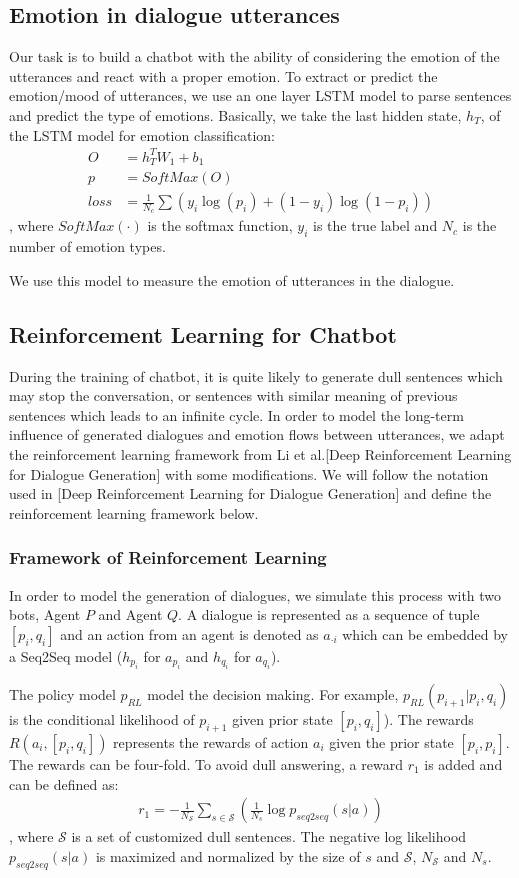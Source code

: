 \documentclass{article}
\begin{document}
\subsection{Emotion in dialogue utterances}
Our task is to build a chatbot with the ability of considering the emotion of the utterances and react with a proper emotion. To extract or predict the emotion/mood of utterances, we use an one layer LSTM model to parse sentences and predict the type of emotions. Basically, we take the last hidden state, $h_T$, of the LSTM model for emotion classification:
\begin{align*}
O &= h_T^TW_1 + b_1\\
p &= SoftMax(O)\\
loss &= \frac{1}{N_{c}}\sum (y_i\log(p_i) + (1-y_i)\log(1 - p_i))
\end{align*}
, where $SoftMax(\cdot)$ is the softmax function, $y_i$ is the true label and $N_c$ is the number of emotion types.

We use this model to measure the emotion of utterances in the dialogue.

\subsection{Reinforcement Learning for Chatbot}
During the training of chatbot, it is quite likely to generate dull sentences which may stop the conversation, or sentences with similar meaning of previous sentences which leads to an infinite cycle. In order to model the long-term influence of generated dialogues and emotion flows between utterances, we adapt the reinforcement learning framework from Li et al.[Deep Reinforcement Learning for Dialogue Generation] with some modifications. We will follow the notation used in [Deep Reinforcement Learning for Dialogue Generation] and define the reinforcement learning framework below.

\subsubsection{Framework of Reinforcement Learning}
In order to model the generation of dialogues, we simulate this process with two bots, Agent $P$ and Agent $Q$. A dialogue is represented as a sequence of tuple $[p_i, q_i]$ and an action from an agent is denoted as $a_{\cdot i}$ which can be embedded by a Seq2Seq model ($h_{p_i}$ for $a_{p_i}$ and $h_{q_i}$ for $a_{q_i}$).

The policy model $p_{RL}$ model the decision making. For example, $p_{RL}(p_{i+1} | p_i, q_i)$ is the conditional likelihood of $p_{i+1}$ given prior state $[p_i, q_i]$). The rewards $R(a_i, [p_i, q_i])$ represents the rewards of action $a_i$ given the prior state $[p_i, p_i]$. The rewards can be four-fold. To avoid dull answering, a reward $r_1$ is added and can be defined as:
\begin{align*}
r_1 = - \frac{1}{N_{\mathcal{S}}} \sum_{s \in \mathcal{S}}(\frac{1}{N_s} \log p_{seq2seq}(s|a))
\end{align*}
, where $\mathcal{S}$ is a set of customized dull sentences. The negative log likelihood $p_{seq2seq}(s|a)$ is maximized and normalized by the size of $s$ and $\mathcal{S}$, $N_{\mathcal{S}}$ and $N_{s}$.
\end{document}
